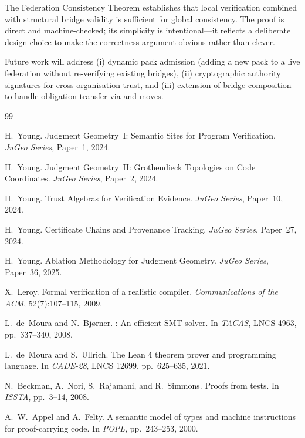 \documentclass[11pt]{article}
\begin{document}
The Federation Consistency Theorem establishes that local verification
combined with structural bridge validity is sufficient for global
consistency.  The proof is direct and machine-checked; its simplicity
is intentional---it reflects a deliberate design choice to make the
correctness argument obvious rather than clever.

Future work will address (i) dynamic pack admission (adding a new pack
to a live federation without re-verifying existing bridges), (ii)
cryptographic authority signatures for cross-organisation trust, and
(iii) extension of bridge composition to handle obligation transfer via
\TRANSPORT{} and \ESCALATE{} moves.

\begin{thebibliography}{99}

H.~Young.
\newblock Judgment Geometry~I: Semantic Sites for Program Verification.
\newblock \textit{JuGeo Series}, Paper~1, 2024.

H.~Young.
\newblock Judgment Geometry~II: Grothendieck Topologies on Code Coordinates.
\newblock \textit{JuGeo Series}, Paper~2, 2024.

H.~Young.
\newblock Trust Algebras for Verification Evidence.
\newblock \textit{JuGeo Series}, Paper~10, 2024.

H.~Young.
\newblock Certificate Chains and Provenance Tracking.
\newblock \textit{JuGeo Series}, Paper~27, 2024.

H.~Young.
\newblock Ablation Methodology for Judgment Geometry.
\newblock \textit{JuGeo Series}, Paper~36, 2025.

X.~Leroy.
\newblock Formal verification of a realistic compiler.
\newblock \textit{Communications of the ACM}, 52(7):107--115, 2009.

L.~de~Moura and N.~Bj{\o}rner.
: An efficient {SMT} solver.
\newblock In \textit{TACAS}, LNCS 4963, pp.~337--340, 2008.

L.~de~Moura and S.~Ullrich.
\newblock The {Lean 4} theorem prover and programming language.
\newblock In \textit{CADE-28}, LNCS 12699, pp.~625--635, 2021.

N.~Beckman, A.~Nori, S.~Rajamani, and R.~Simmons.
\newblock Proofs from tests.
\newblock In \textit{ISSTA}, pp.~3--14, 2008.

A.~W.~Appel and A.~Felty.
\newblock A semantic model of types and machine instructions for proof-carrying
  code.
\newblock In \textit{POPL}, pp.~243--253, 2000.


\end{thebibliography}
\end{document}
